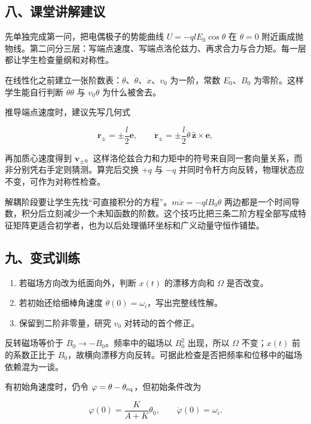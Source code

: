 \documentclass[12pt,a4paper,UTF8]{ctexart}
\newcommand{\tightlist}{\setlength{\itemsep}{0pt}\setlength{\parskip}{0pt}}
\begin{document}
\subsection{八、课堂讲解建议}\label{ux516bux8bfeux5802ux8bb2ux89e3ux5efaux8bae-3}

先单独完成第一问，把电偶极子的势能曲线 \(U=-qlE_0\cos\theta\) 在
\(\theta=0\)
附近画成抛物线。第二问分三层：写端点速度、写端点洛伦兹力、再求合力与合力矩。每一层都让学生检查量纲和对称性。

在线性化之前建立一张阶数表：\(\theta\)、\(\dot\theta\)、\(\dot x\)、\(v_0\)
为一阶，常数 \(E_0\)、\(B_0\) 为零阶。这样学生能自行判断
\(\dot\theta\theta\) 与 \(v_0\theta\) 为什么被舍去。

推导端点速度时，建议先写几何式

\[\bm r_\pm=\pm\frac l2\bm e,
\qquad
\dot{\bm r}_\pm=\pm\frac l2\dot\theta\,\hat{\bm z}\times\bm e,\]

再加质心速度得到
\(\bm v_\pm\)。这样洛伦兹合力和力矩中的符号来自同一套向量关系，而非分别凭右手定则猜测。算完后交换
\(+q\) 与 \(-q\) 并同时令杆方向反转，物理状态应不变，可作为对称性检查。

解耦阶段要让学生先找``可直接积分的方程''。\(m\ddot x=-qlB_0\dot\theta\)
两边都是一个时间导数，积分后立刻减少一个未知函数的阶数。这个技巧比把三条二阶方程全部写成特征矩阵更适合初学者，也为以后处理循环坐标和广义动量守恒作铺垫。

\subsection{九、变式训练}\label{ux4e5dux53d8ux5f0fux8badux7ec3-3}

\begin{enumerate}
\def\labelenumi{\arabic{enumi}.}
\tightlist
\item
  若磁场方向改为纸面向外，判断 \(x(t)\) 的漂移方向和 \(\Omega\)
  是否改变。
\item
  若初始还给细棒角速度 \(\dot\theta(0)=\omega_i\)，写出完整线性解。
\item
  保留到二阶非零量，研究 \(v_0\) 对转动的首个修正。
\end{enumerate}

反转磁场等价于 \(B_0\to-B_0\)。频率中的磁场以 \(B_0^2\) 出现，所以
\(\Omega\) 不变；\(x(t)\) 前的系数正比于
\(B_0\)，故横向漂移方向反转。可据此检查是否把频率和位移中的磁场依赖混为一谈。

有初始角速度时，仍令 \(\varphi=\theta-\theta_{\rm eq}\)，但初始条件改为

\[\varphi(0)=\frac{K}{A+K}\theta_0,\qquad
\dot\varphi(0)=\omega_i.\]
\end{document}
